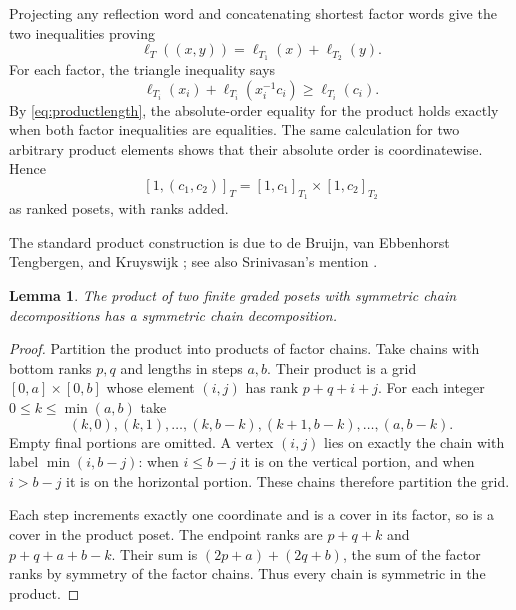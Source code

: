 \documentclass[11pt]{article}
\newtheorem{lemma}[theorem]{Lemma}
\theoremstyle{definition}
\begin{document}
 Projecting any reflection word and concatenating shortest
factor words give the two inequalities proving
\begin{equation}\label{eq:productlength}
 \ell_T((x,y))=\ell_{T_1}(x)+\ell_{T_2}(y).
\end{equation}
For each factor, the triangle inequality says
\[
 \ell_{T_i}(x_i)+\ell_{T_i}(x_i^{-1}c_i)\geq\ell_{T_i}(c_i).
\]
By \eqref{eq:productlength}, the absolute-order equality for the
product holds exactly when both factor inequalities are equalities.
The same calculation for two arbitrary product elements shows that
their absolute order is coordinatewise. Hence
\begin{equation}\label{eq:intervalproduct}
 [1,(c_1,c_2)]_T=[1,c_1]_{T_1}\times[1,c_2]_{T_2}
\end{equation}
as ranked posets, with ranks added.

The standard product construction is due to de Bruijn, van Ebbenhorst
Tengbergen, and Kruyswijk \cite{BTK}; see also Srinivasan's mention
\cite[\S1]{Srinivasan}.

\begin{lemma}\label{lem:product}
The product of two finite graded posets with symmetric chain
decompositions has a symmetric chain decomposition.
\end{lemma}
\begin{proof}
Partition the product into products of factor chains. Take chains
with bottom ranks $p,q$ and lengths in steps $a,b$. Their product
is a grid $[0,a]\times[0,b]$ whose element $(i,j)$ has rank
$p+q+i+j$. For each integer $0\leq k\leq\min(a,b)$ take
\begin{equation}\label{eq:grid}
 (k,0),(k,1),\ldots,(k,b-k),
 (k+1,b-k),\ldots,(a,b-k).
\end{equation}
Empty final portions are omitted. A vertex $(i,j)$ lies on exactly
the chain with label $\min(i,b-j)$: when $i\leq b-j$ it is on
the vertical portion, and when $i>b-j$ it is on the horizontal
portion. These chains therefore partition the grid.

Each step increments exactly one coordinate and is a cover in its
factor, so is a cover in the product poset. The endpoint ranks are
$p+q+k$ and $p+q+a+b-k$. Their sum is
$(2p+a)+(2q+b)$, the sum of the factor ranks by symmetry of the
factor chains. Thus every chain is symmetric in the product.
\end{proof}
\end{document}
